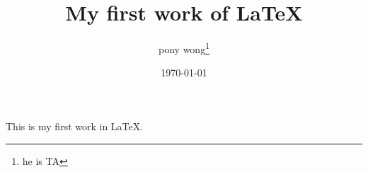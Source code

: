 \documentclass[12pt]{article}
\title{My first work of \LaTeX}
\author{pony wong\footnote{he is TA}}
\date{\today}
\begin{document}
\maketitle
This is my first work in \LaTeX.
\end{document}
